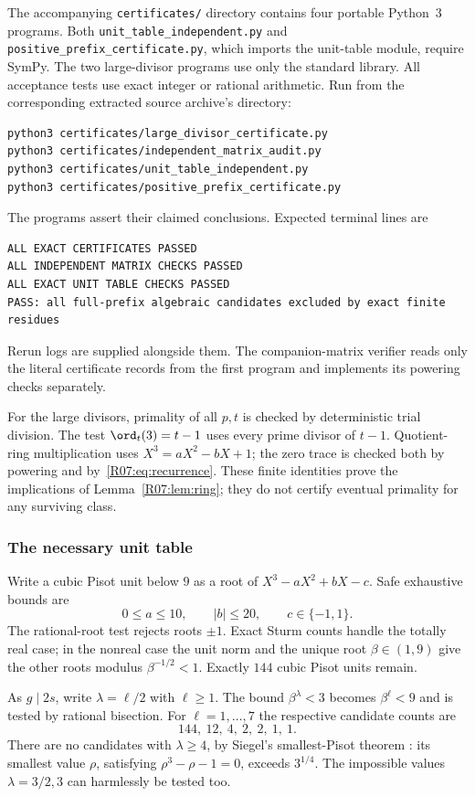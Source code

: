\documentclass[11pt,a4paper]{article}
\theoremstyle{definition}\newtheorem{definition}[theorem]{Definition}
\theoremstyle{remark}\newtheorem{remark}[theorem]{Remark}
\begin{document}
The accompanying \texttt{certificates/} directory contains four portable
Python~3 programs. Both \texttt{unit\_table\_independent.py} and
\texttt{positive\_prefix\_certificate.py}, which imports the unit-table
module, require SymPy. The two large-divisor programs use only the
standard library. All acceptance tests use exact integer or rational
arithmetic.
Run from the corresponding extracted source archive's directory:
\begin{lstlisting}[language=bash]
python3 certificates/large_divisor_certificate.py
python3 certificates/independent_matrix_audit.py
python3 certificates/unit_table_independent.py
python3 certificates/positive_prefix_certificate.py
\end{lstlisting}
The programs assert their claimed conclusions. Expected terminal lines are
\begin{lstlisting}[language={}]
ALL EXACT CERTIFICATES PASSED
ALL INDEPENDENT MATRIX CHECKS PASSED
ALL EXACT UNIT TABLE CHECKS PASSED
PASS: all full-prefix algebraic candidates excluded by exact finite residues
\end{lstlisting}
Rerun logs are supplied alongside them. The companion-matrix verifier
reads only the literal certificate records from the first program and
implements its powering checks separately.

For the large divisors, primality of all $p,t$ is checked by deterministic
trial division. The test $\ord_t(3)=t-1$ uses every prime divisor of
$t-1$. Quotient-ring multiplication uses $X^3=aX^2-bX+1$;
the zero trace is checked both by powering and by~\eqref{R07:eq:recurrence}.
These finite identities prove the implications of Lemma~\ref{R07:lem:ring};
they do not certify eventual primality for any surviving class.

\subsubsection{The necessary unit table}\label{R07:app:unit}
Write a cubic Pisot unit below $9$ as a root of
$X^3-aX^2+bX-c$. Safe exhaustive bounds are
\[
                     0\le a\le10,\qquad |b|\le20,
                     \qquad c\in\{-1,1\}.
\]
The rational-root test rejects roots $\pm1$. Exact Sturm counts handle
the totally real case; in the nonreal case the unit norm and the unique
root $\beta\in(1,9)$ give the other roots modulus $\beta^{-1/2}<1$.
Exactly $144$ cubic Pisot units remain.

As $g\mid2s$, write $\lambda=\ell/2$ with $\ell\ge1$.
The bound $\beta^\lambda<3$ becomes $\beta^\ell<9$ and is tested by
rational bisection. For $\ell=1,\ldots,7$ the respective candidate
counts are
\[
                         144,\ 12,\ 4,\ 2,\ 2,\ 1,\ 1.
\]
There are no candidates with $\lambda\ge4$, by Siegel's smallest-Pisot
theorem \cite{Siegel}: its smallest value $\rho$, satisfying
$\rho^3-\rho-1=0$, exceeds $3^{1/4}$.
The impossible values $\lambda=3/2,3$ can harmlessly be tested too.
\end{document}
